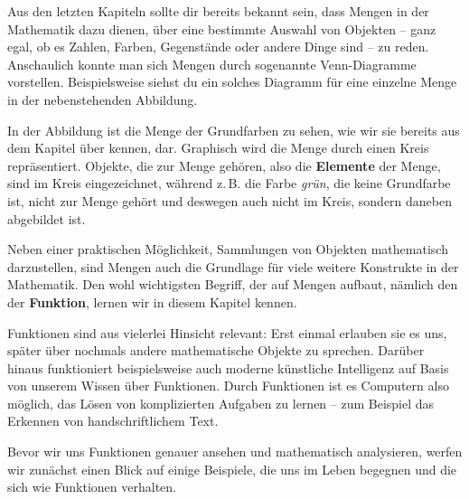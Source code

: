 \documentclass[../../main.tex]{subfiles}
\begin{document}
\label{sec:abbildungen_intuition}
Aus den letzten Kapiteln sollte dir bereits bekannt sein, dass Mengen in der Mathematik dazu dienen, über eine bestimmte Auswahl von Objekten -- ganz egal, ob es Zahlen, Farben, Gegenstände oder andere Dinge sind -- zu reden. Anschaulich konnte man sich Mengen durch sogenannte Venn-Diagramme vorstellen. Beispielsweise siehst du ein solches Diagramm für eine einzelne Menge in der nebenstehenden Abbildung.


In der Abbildung ist die Menge der Grundfarben zu sehen, wie wir sie bereits aus dem Kapitel über  kennen, dar. Graphisch wird die Menge durch einen Kreis repräsentiert. Objekte, die zur Menge gehören, also die \textbf{Elemente} der Menge, sind im Kreis eingezeichnet, während z.\,B. die Farbe \emph{grün}, die keine Grundfarbe ist, nicht zur Menge gehört und deswegen auch nicht im Kreis, sondern daneben abgebildet ist.

Neben einer praktischen Möglichkeit, Sammlungen von Objekten mathematisch darzustellen, sind Mengen auch die Grundlage für viele weitere Konstrukte in der Mathematik. Den wohl wichtigsten Begriff, der auf Mengen aufbaut, nämlich den der \textbf{Funktion}, lernen wir in diesem Kapitel kennen.

Funktionen sind aus vielerlei Hinsicht relevant: Erst einmal erlauben sie es uns, später über nochmals andere mathematische Objekte zu sprechen. Darüber hinaus funktioniert beispielsweise auch moderne künstliche Intelligenz auf Basis von unserem Wissen über Funktionen. Durch Funktionen ist es Computern also möglich, das Lösen von komplizierten Aufgaben zu lernen -- zum Beispiel das Erkennen von handschriftlichem Text.

Bevor wir uns Funktionen genauer ansehen und mathematisch analysieren, werfen wir zunächst einen Blick auf einige Beispiele, die uns im Leben begegnen und die sich wie Funktionen verhalten.
\end{document}
